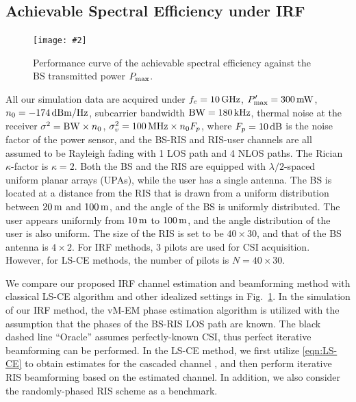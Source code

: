 \documentclass[journal,twocolumn]{IEEEtran}
\theoremstyle{nonumberplain}
\newcommand{\myincludegraphics}[2][width=1\linewidth]{\texttt{[image: \#2]}}
\newcommand{\myincludegraphics}[2][width=0.8\linewidth]{\texttt{[image: \#2]}}
\begin{document}
\subsection{Achievable Spectral Efficiency under IRF} \label{Achievable Spectral Efficiency under IRF}
    \begin{figure}[!t]
        \centering
        \myincludegraphics{data/rate.pdf}
        \caption{Performance curve of the achievable spectral efficiency against the BS transmitted power $P_{\rm max}$.}
        \label{fig:rate}
    \end{figure}
    All our simulation data are acquired under $f_c = 10\,{\rm GHz}$, $P_{\rm max}'=300 \,{\rm mW}$, $n_0=-174\,{\rm dBm/Hz}$, subcarrier bandwidth ${\rm BW} = 180\,{\rm kHz}$, thermal noise at the receiver $\sigma^2 = {\rm BW}\times n_0$, $\sigma_v^2=100\,{\rm MHz}\times n_0 F_p$, where $F_p=10\,{\rm dB}$ is the noise factor of the power sensor, and the BS-RIS and RIS-user channels are all assumed to be Rayleigh fading with 1 \ac{LOS} path and 4 \ac{NLOS} paths. 
    The Rician $\kappa$-factor is $\kappa=2$. 
    Both the BS and the RIS are equipped with $\lambda/2$-spaced uniform planar arrays (UPAs), while the user has a single antenna. 
    The BS is located at a distance from the RIS that is drawn from a uniform distribution between $20\,{\rm m}$ and $100\,{\rm m}$, and the angle of the BS is uniformly distributed. 
    The user appears uniformly from $10\,{\rm m}$ to $100\,{\rm m}$, and the angle distribution of the user is also uniform. 
    The size of the RIS is set to be $40\times 30$, and that of the BS antenna is $4\times 2$. 
    For IRF methods, 3 pilots are used for CSI acquisition. 
    However, for LS-CE methods, the number of pilots is $N=40\times 30$. 

    We compare our proposed \ac{IRF} channel estimation and beamforming method with classical LS-CE algorithm and other idealized settings in Fig.~\ref{fig:rate}. 
    In the simulation of our IRF method, the vM-EM phase estimation algorithm is utilized with the assumption that the phases of the BS-RIS \ac{LOS} path are known. 
    The black dashed line ``Oracle'' assumes perfectly-known CSI, thus perfect iterative beamforming can be performed. 
    In the LS-CE method, we first utilize \eqref{eqn:LS-CE} to obtain estimates for the cascaded channel \cite{kundu2021channel,wei2021channel}, and then perform iterative RIS beamforming based on the estimated channel. 
    In addition, we also consider the randomly-phased RIS scheme as a benchmark.  
\end{document}
